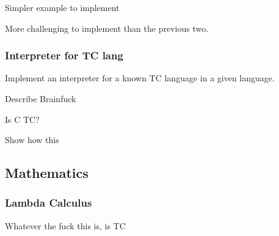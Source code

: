 Simpler example to implement


More challenging to implement than the previous two.


\subsubsection{Interpreter for TC lang}

Implement an interpreter for a known TC language in a given language.


Describe Brainfuck


Is C TC?

Show how this


\subsection{Mathematics}

\subsubsection{Lambda Calculus}

Whatever the fuck this is, is TC